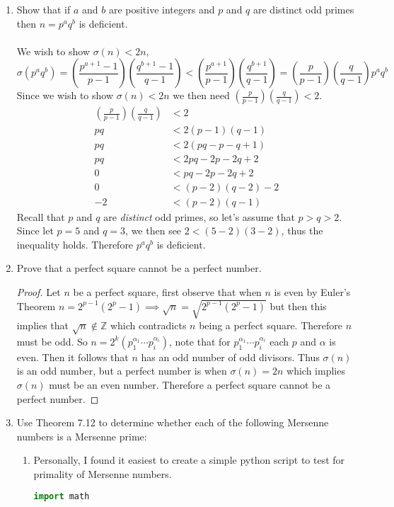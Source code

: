 \documentclass[class=article, crop=false]{standalone}
\def\integers{{\mathbb Z}}
\begin{document}
\begin{enumerate}
\item
  Show that if $a$ and $b$ are positive integers
  and $p$ and $q$ are distinct odd primes
  then $n=p^aq^b$ is deficient. \\\\
  We wish to show $\sigma(n) < 2n$,
  $$\sigma(p^a q^b) = \left(\frac{p^{a+1}-1}{p-1}\right) \left(\frac{q^{b+1}-1}{q-1}\right)
  < \left(\frac{p^{a+1}}{p-1}\right) \left(\frac{q^{b+1}}{q-1}\right)
  = \left(\frac{p}{p-1}\right)\left(\frac{q}{q-1}\right) p^a q^b$$
  Since we wish to show $\sigma(n) < 2n$ we then need 
  $\left(\frac{p}{p-1}\right)\left(\frac{q}{q-1}\right) < 2$.
  \begin{align*}
	\left(\frac{p}{p-1}\right)\left(\frac{q}{q-1}\right) &< 2 \\
	pq &< 2(p-1)(q-1) \\
	pq &< 2\left(pq -p -q + 1\right) \\
	pq &< 2pq -2p -2q +2 \\
	0 &< pq -2p -2q +2 \\
	0 &< (p-2)(q-2) -2 \\
	-2 &< (p-2)(q-1)
  \end{align*}
  Recall that $p$ and $q$ are \textit{distinct} odd primes, so let's assume that
  $p>q>2$. Since let $p=5$ and $q=3$, we then see $2 < (5-2)(3-2)$, thus the
  inequality holds. Therefore $p^a q^b$ is deficient.

\item
  Prove that a perfect square cannot be a perfect number.
  \begin{proof}
	Let $n$ be a perfect square, first observe that when $n$ is even by Euler's Theorem 
	$n= 2^{p-1} \left(2^p -1\right) \implies \sqrt{n} = \sqrt{2^{p-1} \left(2^p -1\right)}$
	but then this implies that $\sqrt{n} \not\in \integers$ which contradicts $n$ being a
	perfect square. Therefore $n$ must be odd. So 
	$n= 2^{k} \left(p_1^{\alpha_1}\cdots p_i^{\alpha_i}\right)$, note that for 
	$p_1^{\alpha_1}\cdots p_i^{\alpha_i}$ each $p$ and $\alpha$ is even.
	Then it follows that $n$ has an odd number of odd divisors. Thus $\sigma(n)$ is an odd number,
	but a perfect number is when $\sigma(n)=2n$ which implies $\sigma(n)$ must be an even number.
	Therefore a perfect square cannot be a perfect number.
  \end{proof}

\item
  Use Theorem 7.12 to determine whether each of the following Mersenne numbers
  is a Mersenne prime:
  \begin{enumerate}
  \item[] Personally, I found it easiest to create a simple python script to test 
  for primality of Mersenne numbers.
\begin{center}
\begin{lstlisting}[language=Python]
import math


\end{lstlisting}
\end{center}
\end{enumerate}
\end{enumerate}
\end{document}
